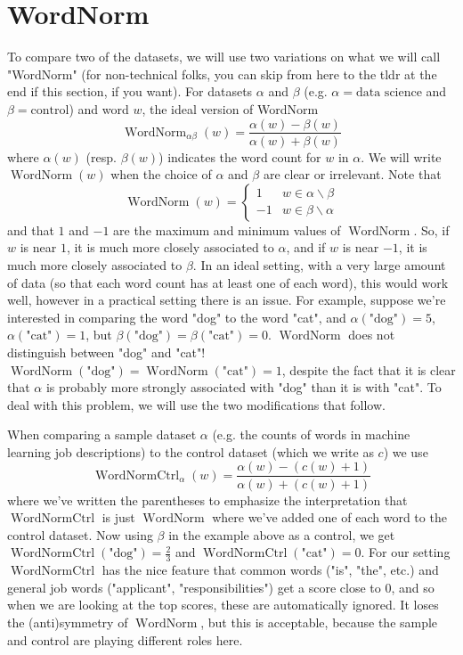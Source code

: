 \documentclass[12pt]{article}
\DeclareMathOperator{\WN}{WordNorm}
\DeclareMathOperator{\WNt}{WordNormCtrl}
\begin{document}
\section{WordNorm} To compare two of the datasets, we will use two variations on what we will call "WordNorm" (for non-technical folks, you can skip from here to the tldr at the end if this section, if you want). For datasets $\alpha$ and $\beta$ (e.g. $\alpha = \text{data science}$ and $\beta = \text{control}$) and word $w$, the ideal version of WordNorm
\begin{equation} \label{eqn:WordNorm}
 \WN_{\alpha\beta}(w) = \frac{\alpha(w)-\beta(w)}{\alpha(w)+\beta(w)}
\end{equation}
where $\alpha(w)$ (resp. $\beta(w)$) indicates the word count for $w$ in $\alpha$. We will write $\WN(w)$ when the choice of $\alpha$ and $\beta$ are clear or irrelevant. Note that 
\[
 \WN(w) = \begin{cases} 1 & w \in \alpha \smallsetminus \beta \\ -1 & w \in \beta \smallsetminus \alpha \end{cases}
\]
and that $1$ and $-1$ are the maximum and minimum values of $\WN$. So, if $w$ is near $1$, it is much more closely associated to $\alpha$, and if $w$ is near $-1$, it is much more closely associated to $\beta$. In an ideal setting, with a very large amount of data (so that each word count has at least one of each word), this would work well, however in a practical setting there is an issue. For example, suppose we're interested in comparing the word "dog" to the word "cat", and $\alpha(\text{"dog"}) = 5$, $\alpha(\text{"cat"}) = 1$, but $\beta(\text{"dog"})=\beta(\text{"cat"})=0$. $\WN$ does not distinguish between "dog" and "cat"! $\WN(\text{"dog"})=\WN(\text{"cat"}) = 1$, despite the fact that it is clear that $\alpha$ is probably more strongly associated with "dog" than it is with "cat". To deal with this problem, we will use the two modifications that follow.

When comparing a sample dataset $\alpha$ (e.g. the counts of words in machine learning job descriptions) to the control dataset (which we write as $c$) we use
\begin{equation} \label{eqn:WordNormCtrl}
 \WNt_\alpha(w) = \frac{\alpha(w) - (c(w)+1)}{\alpha(w) + (c(w) + 1)}
\end{equation}
where we've written the parentheses to emphasize the interpretation that $\WNt$ is just $\WN$ where we've added one of each word to the control dataset. Now using $\beta$ in the example above as a control, we get $\WNt(\text{"dog"})=\frac{2}{3}$ and $\WNt(\text{"cat"})=0$. For our setting $\WNt$ has the nice feature that common words ("is", "the", etc.) and general job words ("applicant", "responsibilities") get a score close to $0$, and so when we are looking at the top scores, these are automatically ignored. It loses the (anti)symmetry of $\WN$, but this is acceptable, because the sample and control are playing different roles here.
\end{document}
